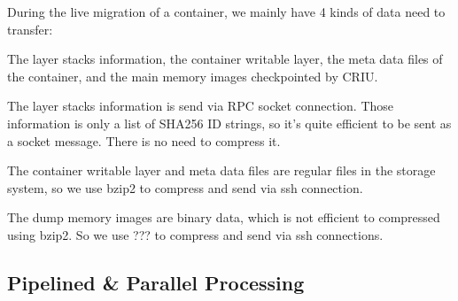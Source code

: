 During the live migration of a container, we mainly have 4 kinds of data need to transfer:

The layer stacks information, the container writable layer, the meta data files of the container, and the main memory images checkpointed by CRIU. 


The layer stacks information is send via RPC socket connection. Those information is only a list of SHA256 ID strings, so it's quite efficient to be sent as a socket message. There is no need to compress it.

The container writable layer and meta data files are regular files in the storage system, so we use bzip2  to compress and send via ssh connection.

The dump memory images are binary data, which is not efficient to compressed using bzip2. So we use ??? to compress and send via ssh connections.

\subsection{Pipelined \& Parallel Processing}









